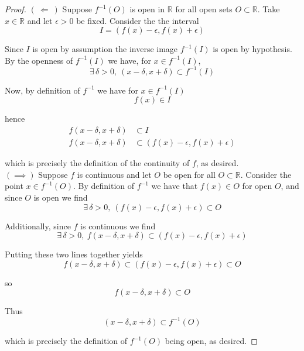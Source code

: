 \documentclass[12pt]{article}
\newlength\tindent
\renewcommand{\indent}{\hspace*{\tindent}}
\newcommand{\R}{\mathbb R}
\newcommand{\limplies}{~\Longleftarrow ~} %
\newcommand{\rimplies}{\implies} %
\begin{document}
\begin{proof} $(\limplies)$ Suppose $f^{-1}(O)$ is open in $\R$ for all open sets $O \subset \R$. Take $x \in \R$ and let $\epsilon > 0$ be fixed. Consider the the interval
\begin{equation*}
	I = (f(x) - \epsilon, f(x) + \epsilon)
\end{equation*}

\indent Since $I$ is open by assumption the inverse image $f^{-1}(I)$ is open by hypothesis. By the openness of $f^{-1}(I)$ we have, for $x \in f^{-1}(I)$,
\begin{equation*}
	\exists\,\delta > 0,~(x - \delta, x + \delta) \subset f^{-1}(I)
\end{equation*}

Now, by definition of $f^{-1}$ we have for $x \in f^{-1}(I)$
\begin{equation*}
	f(x) \in I
\end{equation*}

hence
\begin{align*}
	f(x - \delta, x + \delta) &\subset I \\
	f(x - \delta, x + \delta) &\subset (f(x) - \epsilon, f(x) + \epsilon)
\end{align*}

which is precisely the definition of the continuity of $f$, as desired. \\

$(\implies)$ Suppose $f$ is continuous and let $O$ be open for all $O \subset \R$. Consider the point $x \in f^{-1}(O)$. By definition of $f^{-1}$ we have that $f(x) \in O$ for open $O$, and since $O$ is open we find
\begin{equation*}
	\exists\,\delta > 0,~ (f(x) - \epsilon, f(x) + \epsilon) \subset O
\end{equation*}

Additionally, since $f$ is continuous we find
\begin{equation*}
	\exists\,\delta > 0,~ f(x - \delta, x + \delta) \subset (f(x) - \epsilon, f(x) + \epsilon)
\end{equation*}


Putting these two lines together yields
\begin{equation*}
	f(x - \delta, x + \delta) \subset (f(x) - \epsilon, f(x) + \epsilon) \subset O
\end{equation*}

so
\begin{equation*}
	f(x - \delta, x + \delta) \subset O
\end{equation*}

Thus
\begin{equation*}
	(x - \delta, x + \delta) \subset f^{-1}(O)
\end{equation*}

which is precisely the definition of $f^{-1}(O)$ being open, as desired.
\end{proof} \hfill
\end{document}
